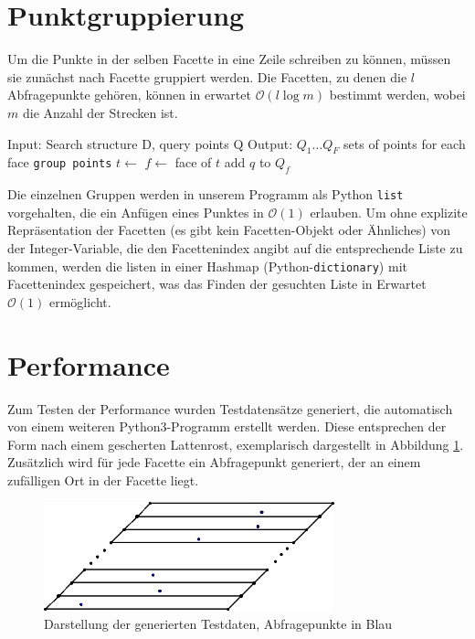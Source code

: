 \documentclass[11pt, a4paper]{article}
\begin{document}
\section{Punktgruppierung}
Um die Punkte in der selben Facette in eine Zeile schreiben zu können, müssen sie zunächst nach Facette gruppiert werden. Die Facetten, zu denen die $l$ Abfragepunkte gehören, können in erwartet $\mathcal{O}(l \log m)$ bestimmt werden, wobei $m$ die Anzahl der Strecken ist.

\begin{algorithmic}[1]
\State Input: Search structure D, query points Q
\State Output: $Q_1 \dots Q_F$ sets of points for each face
\State \texttt{group points}
	\State $t \gets$ 
	\State $f \gets$ face of $t$
	\State add $q$ to $Q_f$
\EndFor
\end{algorithmic}

Die einzelnen Gruppen werden in unserem Programm als Python \texttt{list} vorgehalten, die ein Anfügen eines Punktes in $\mathcal{O}(1)$ erlauben. Um ohne explizite Repräsentation der Facetten (es gibt kein Facetten-Objekt oder Ähnliches) von der Integer-Variable, die den Facettenindex angibt auf die entsprechende Liste zu kommen, werden die listen in einer Hashmap (Python-\texttt{dictionary}) mit Facettenindex gespeichert, was das Finden der gesuchten Liste in Erwartet $\mathcal{O}(1)$ ermöglicht.

\section{Performance}
Zum Testen der Performance wurden Testdatensätze generiert, die automatisch von einem weiteren Python3-Programm erstellt werden. Diese entsprechen der Form nach einem gescherten Lattenrost, exemplarisch dargestellt in Abbildung \ref{fig:generated_dataset}. Zusätzlich wird für jede Facette ein Abfragepunkt generiert, der an einem zufälligen Ort in der Facette liegt.

\begin{figure}[h!]
	\centering
	\includegraphics[width=0.75\textwidth]{generated_dataset}
	\caption{Darstellung der generierten Testdaten, Abfragepunkte in Blau}
	\label{fig:generated_dataset}
\end{figure}
\end{document}
